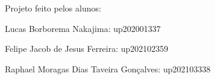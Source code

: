 Projeto feito pelos alunos\+:

Lucas Borborema Nakajima\+: up202001337

Felipe Jacob de Jesus Ferreira\+: up202102359

Raphael Moragas Dias Taveira Gonçalves\+: up202103338 